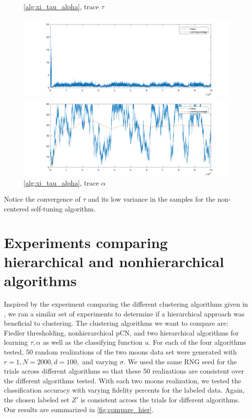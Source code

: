 \documentclass{siamart1116}
\begin{document}
    \begin{figure}[!htb]
        \begin{minipage}{0.48\textwidth}
            \centering
            \caption{\label{fig:moon_noncentered_tau} \cref{alg:xi_tau_alpha}, trace $\tau$}
            \includegraphics[width=\linewidth]{graphics/moons/noncentered/trace_tau.png}
        \end{minipage} \hfill
        \begin{minipage}{0.48\textwidth}
            \centering
            \caption{\label{fig:moon_noncentered_alpha} \cref{alg:xi_tau_alpha}, trace $\alpha$}
            \includegraphics[width=\linewidth]{graphics/moons/noncentered/trace_alpha.png}
        \end{minipage}
    \end{figure}

    Notice the convergence of $\tau$ and its low variance in the samples for the non-centered self-tuning algorithm.

\fi

\section{Experiments comparing hierarchical and nonhierarchical algorithms}
    Inspired by the experiment comparing the different clustering algorithms given in \cite{BeLuStZy17}, we ran a similar set of experiments to determine if a hierarchical approach was beneficial to clustering. The clustering algorithms we want to compare are: Fiedler thresholding, nonhierarchical pCN, and two hierarchical algorithms for learning $\tau,\alpha$ as well as the classifying function $u$.
    For each of the four algorithms tested, 50 random realizations of the two moons data set were generated with $r=1,N=2000,d=100,$ and varying $\sigma$. We used the same RNG seed for the trials across different algorithms so that these 50 realizations are consistent over the different algorithms tested. With each two moons realization, we tested the classification accuracy with varying fidelity percents for the labeled data. Again, the chosen labeled set $Z'$ is consistent across the trials for different algorithms. Our results are summarized in \cref{fig:compare_hier}.
\end{document}
